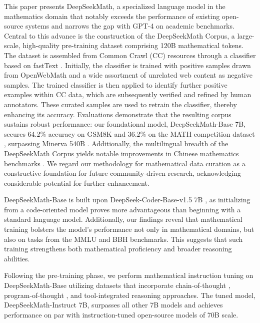 This paper presents DeepSeekMath, a specialized language model in the mathematics domain that notably exceeds the performance of existing open-source systems and narrows the gap with GPT-4 on academic benchmarks. Central to this advance is the construction of the DeepSeekMath Corpus, a large-scale, high-quality pre-training dataset comprising 120B mathematical tokens. The dataset is assembled from Common Crawl (CC) resources through a classifier based on fastText \citep{joulin2016fasttext}. Initially, the classifier is trained with positive samples drawn from OpenWebMath \citep{openwebmath} and a wide assortment of unrelated web content as negative samples. The trained classifier is then applied to identify further positive examples within CC data, which are subsequently verified and refined by human annotators. These curated samples are used to retrain the classifier, thereby enhancing its accuracy. Evaluations demonstrate that the resulting corpus sustains robust performance: our foundational model, DeepSeekMath-Base 7B, secures 64.2\% accuracy on GSM8K \citep{gsm8k} and 36.2\% on the MATH competition dataset \citep{MATH}, surpassing Minerva 540B \citep{minerva}. Additionally, the multilingual breadth of the DeepSeekMath Corpus yields notable improvements in Chinese mathematics benchmarks \citep{wei2023cmath,agieval}. We regard our methodology for mathematical data curation as a constructive foundation for future community-driven research, acknowledging considerable potential for further enhancement.

DeepSeekMath-Base is built upon DeepSeek-Coder-Base-v1.5 7B \citep{deepseek-coder}, as initializing from a code-oriented model proves more advantageous than beginning with a standard language model. Additionally, our findings reveal that mathematical training bolsters the model’s performance not only in mathematical domains, but also on tasks from the MMLU \citep{mmlu} and BBH \citep{bbh} benchmarks. This suggests that such training strengthens both mathematical proficiency and broader reasoning abilities.

Following the pre-training phase, we perform mathematical instruction tuning on DeepSeekMath-Base utilizing datasets that incorporate chain-of-thought \citep{cot}, program-of-thought \citep{pot,pal}, and tool-integrated reasoning \citep{tora} approaches. The tuned model, DeepSeekMath-Instruct 7B, surpasses all other 7B models and achieves performance on par with instruction-tuned open-source models of 70B scale.


